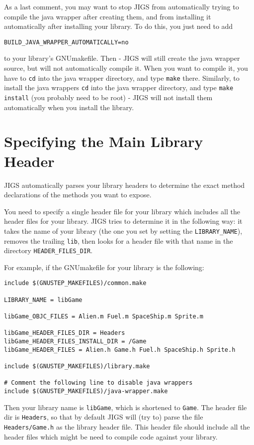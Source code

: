 As a last comment, you may want to stop JIGS from automatically trying
to compile the java wrapper after creating them, and from installing
it automatically after installing your library.  To do this, you just
need to add
\begin{verbatim}
BUILD_JAVA_WRAPPER_AUTOMATICALLY=no
\end{verbatim}
to your library's GNUmakefile.  Then - JIGS will still create the java
wrapper source, but will not automatically compile it.  When you want
to compile it, you have to \texttt{cd} into the java wrapper
directory, and type \texttt{make} there.  Similarly, to install the
java wrappers \texttt{cd} into the java wrapper directory, and type
\texttt{make install} (you probably need to be root) - JIGS will not 
install them automatically when you install the library.

\section{Specifying the Main Library Header}
JIGS automatically parses your library headers to determine the exact
method declarations of the methods you want to expose.  

You need to specify a single header file for your library which
includes all the header files for your library.  JIGS tries to
determine it in the following way: it takes the name of your library 
(the one you set by setting the \texttt{LIBRARY\_NAME}), removes 
the trailing \texttt{lib}, then looks for a header file with that name 
in the directory \texttt{HEADER\_FILES\_DIR}. 

For example, if the GNUmakefile for your library is the following:

\begin{verbatim}
include $(GNUSTEP_MAKEFILES)/common.make

LIBRARY_NAME = libGame

libGame_OBJC_FILES = Alien.m Fuel.m SpaceShip.m Sprite.m

libGame_HEADER_FILES_DIR = Headers
libGame_HEADER_FILES_INSTALL_DIR = /Game
libGame_HEADER_FILES = Alien.h Game.h Fuel.h SpaceShip.h Sprite.h

include $(GNUSTEP_MAKEFILES)/library.make

# Comment the following line to disable java wrappers
include $(GNUSTEP_MAKEFILES)/java-wrapper.make
\end{verbatim}

Then your library name is \texttt{libGame}, which is shortened to
\texttt{Game}.  The header file dir is \texttt{Headers}, so that 
by default JIGS will (try to) parse the file \texttt{Headers/Game.h}
as the library header file.  This header file should include all the
header files which might be need to compile code against your library.

